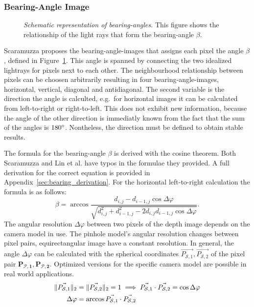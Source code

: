 \subsubsection{Bearing-Angle Image}

\begin{figure}[H]
    \centering
    \scalebox{0.9}{%
    }
    \caption[Schematic representation of \glspl{bearing-angle}]{\emph{Schematic representation of \glspl{bearing-angle}.} This figure shows the relationship of the light rays that form the \gls{bearing-angle} $\beta$.}\label{fig:bearing_angle}
\end{figure}
Scaramuzza\cite{scaramuzza_iros2007} proposes the \Glspl{bearing-angle-image} that assigns each pixel the angle $\beta$, defined in Figure~\ref{fig:bearing_angle}.
This angle is spanned by connecting the two idealized lightrays for pixels next to each other.
The neighbourhood relationship between pixels can be choosen arbitrarily resulting in four \Glspl{bearing-angle-image}, horizontal, vertical, diagonal and antidiagonal.
The second variable is the direction the angle is calculted, e.g.~for horizontal images it can be calculated from left-to-right or right-to-left.
This does not exhibit new information, because the angle of the other direction is immediatly known from the fact that the sum of the angles is $180\degree$.
Nontheless, the direction must be defined to obtain stable results.

The formula for the \gls{bearing-angle} $\beta$ is derived with the cosine theorem.
Both Scaramuzza\cite{scaramuzza_iros2007} and Lin et al.\cite{lin_easp2017} have typos in the formulae they provided.
A full derivation for the correct equation is provided in Appendix~\ref{sec:bearing_derivation}.
For the horizontal left-to-right calculation the formula is as follows:
\begin{equation}\label{eq:bearing-angle}
    \beta = \arccos%
            \frac{d_{i,j} - d_{i-1,j} \cos \Delta\varphi}%
                {\sqrt{d_{i,j}^2 + d_{i-1,j}^2 - 2 d_{i,j} d_{i-1,j} \cos \Delta\varphi}}\text{.}
\end{equation}
The angular resolution $\Delta\varphi$ between two pixels of the depth image depends on the camera model in use.
The pinhole model's angular resolution changes between pixel pairs, equirectangular image have a constant resolution.
In general, the angle $\Delta\varphi$ can be calculated with the spherical coordinates $\vec{P_{\mathcal{S},1}}, \vec{P_{\mathcal{S},2}}$ of the pixel pair $\mathbf{P_{\mathcal{P},1}}, \mathbf{P_{\mathcal{P},2}}$.
Optimized versions for the specific camera model are possible in real world applications.
\begin{equation}
\begin{aligned}
    \lVert\vec{P_{\mathcal{S},1}}\rVert_{2} &= \lVert\vec{P_{\mathcal{S},2}}\rVert_{2} = 1 \implies \vec{P_{\mathcal{S},1}} \cdot \vec{P_{\mathcal{S},2}} = \cos \Delta\varphi \\
    \Delta\varphi &= \arccos \vec{P_{\mathcal{S},1}} \cdot \vec{P_{\mathcal{S},2}}
\end{aligned}
\end{equation}

